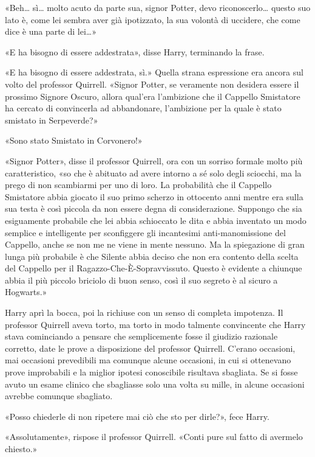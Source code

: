 «Beh… sì… molto acuto da parte sua, signor Potter, devo riconoscerlo… questo suo lato è, come lei sembra aver già ipotizzato, la sua volontà di uccidere, che come dice è una parte di lei…»

«E ha bisogno di essere addestrata», disse Harry, terminando la frase.

«E ha bisogno di essere addestrata, sì.» Quella strana espressione era ancora sul volto del professor Quirrell. «Signor Potter, se veramente non desidera essere il prossimo Signore Oscuro, allora qual’era l’ambizione che il Cappello Smistatore ha cercato di convincerla ad abbandonare, l’ambizione per la quale è stato smistato in Serpeverde?»

«Sono stato Smistato in Corvonero!»

«Signor Potter», disse il professor Quirrell, ora con un sorriso formale molto più caratteristico, «so che è abituato ad avere intorno a sé solo degli sciocchi, ma la prego di non scambiarmi per uno di loro. La probabilità che il Cappello Smistatore abbia giocato il suo primo scherzo in ottocento anni mentre era sulla sua testa è così piccola da non essere degna di considerazione. Suppongo che sia esiguamente probabile che lei abbia schioccato le dita e abbia inventato un modo semplice e intelligente per sconfiggere gli incantesimi anti-manomissione del Cappello, anche se non me ne viene in mente nessuno. Ma la spiegazione di gran lunga più probabile è che Silente abbia deciso che non era contento della scelta del Cappello per il Ragazzo-Che-È-Sopravvissuto. Questo è evidente a chiunque abbia il più piccolo briciolo di buon senso, così il suo segreto è al sicuro a Hogwarts.»

Harry aprì la bocca, poi la richiuse con un senso di completa impotenza. Il professor Quirrell aveva torto, ma torto in modo talmente convincente che Harry stava cominciando a pensare che semplicemente fosse il giudizio razionale corretto, date le prove a disposizione del professor Quirrell. C’erano occasioni, mai occasioni prevedibili ma comunque alcune occasioni, in cui si ottenevano prove improbabili e la miglior ipotesi conoscibile risultava sbagliata. Se si fosse avuto un esame clinico che sbagliasse solo una volta su mille, in alcune occasioni avrebbe comunque sbagliato.

«Posso chiederle di non ripetere mai ciò che sto per dirle?», fece Harry.

«Assolutamente», rispose il professor Quirrell. «Conti pure sul fatto di avermelo chiesto.»

